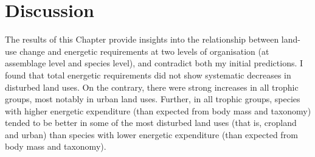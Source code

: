 \clearpage
\section{Discussion}

The results of this Chapter provide insights into the relationship between land-use change and energetic requirements at two levels of organisation (at assemblage level and species level), and contradict both my initial predictions. I found that total energetic requirements did not show systematic decreases in disturbed land uses. On the contrary, there were strong increases in all trophic groups, most notably in urban land uses. Further, in all trophic groups, species with higher energetic expenditure (than expected from body mass and taxonomy) tended to be better in some of the most disturbed land uses (that is, cropland and urban) than species with lower energetic expenditure (than expected from body mass and taxonomy).

